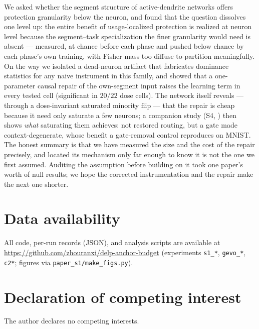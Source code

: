 \documentclass[review,12pt,number]{elsarticle}
\begin{document}
We asked whether the segment structure of active-dendrite networks offers
protection granularity below the neuron, and found that the question
dissolves one level up: the entire benefit of usage-localized protection is
realized at neuron level because the segment--task specialization the finer
granularity would need is absent --- measured, at chance before each phase
and pushed below chance by each phase's own training, with Fisher mass too
diffuse to partition meaningfully. On the way we isolated a dead-neuron
artifact that fabricates dominance statistics for any naive instrument in
this family, and showed that a one-parameter causal repair of the
own-segment input raises the learning term in every tested cell
(significant in $20/22$ dose cells). The network itself reveals --- through
a dose-invariant saturated minority flip --- that the repair is cheap
because it need only saturate a few neurons; a companion study
(S4, \cite{zhou2026bypass}) then shows \emph{what} saturating them
achieves: not restored routing, but a gate made context-degenerate, whose
benefit a gate-removal control reproduces on MNIST. The honest summary is
that we have measured the size and the cost of the repair precisely, and
located its mechanism only far enough to know it is not the one we first
assumed.
Auditing the assumption before
building on it took one paper's worth of null results; we hope the
corrected instrumentation and the repair make the next one shorter.

\section*{Data availability}
All code, per-run records (JSON), and analysis scripts are available at
\url{https://github.com/zhouranxi/delp-anchor-budget} (experiments
\texttt{s1\_*}, \texttt{gevo\_*}, \texttt{c2*}; figures via
\texttt{paper\_s1/make\_figs.py}).

\section*{Declaration of competing interest}
The author declares no competing interests.



\end{document}
